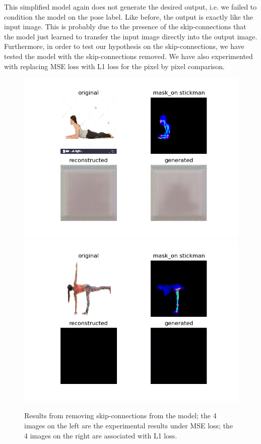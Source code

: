 \documentclass{article}
\begin{document}
\noindent
This simplified model again does not generate the desired output, i.e. we failed to condition the model on the pose label. Like before, the output is exactly like the input image. This is probably due to the presence of the skip-connections that the model just learned to transfer the input image directly into the output image. Furthermore, in order to test our hypothesis on the skip-connections, we have tested the model with the skip-connections removed. We have also experimented with replacing MSE loss with L1 loss for the pixel by pixel comparison.
\begin{figure}[H]
    \centering
    \includegraphics[scale=0.36]{f7.png}
    \includegraphics[scale=0.36]{f8.png}
    \caption{Results from removing skip-connections from the model; the 4 images on the left are the experimental results under MSE loss; the 4 images on the right are associated with L1 loss.}
\end{figure}
\end{document}
